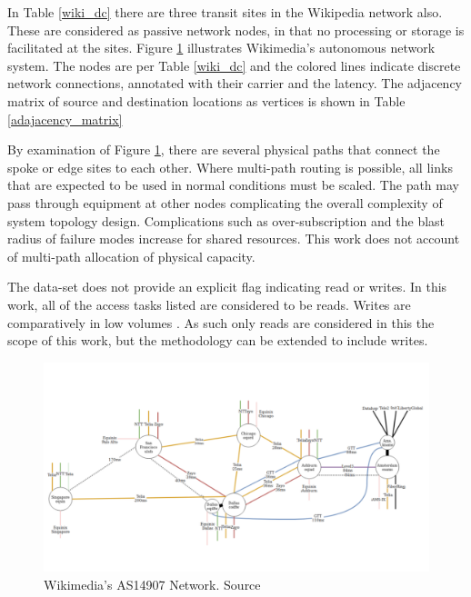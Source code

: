 \documentclass[conference]{IEEEtran}
\begin{document}
In Table \ref{wiki_dc} there are three transit sites in the Wikipedia network also. These are considered as passive network nodes, in that no processing or storage is facilitated at the sites. Figure \ref{wiki_net} illustrates Wikimedia's autonomous network system. The nodes are per Table \ref{wiki_dc} and the colored lines indicate discrete network connections, annotated with their carrier and the latency. The adjacency matrix of source and destination locations as vertices is shown in Table \ref{adajacency_matrix}

By examination of Figure \ref{wiki_net}, there are several physical paths that connect the spoke or edge sites to each other. Where multi-path routing is possible, all links that are expected to be used in normal conditions must be scaled. The path may pass through equipment at other nodes complicating the overall complexity of system topology design. Complications such as over-subscription and the blast radius of failure modes increase for shared resources. This work does not account of multi-path allocation of physical capacity.

The data-set does not provide an explicit flag indicating read or writes. In this work, all of the access tasks listed  are considered to be reads. Writes are comparatively in low volumes \cite{wiki_stats2}. As such only reads are considered in this the scope of this work, but the methodology can be extended to include writes.


\begin{figure}[htbp]
\centering
\includegraphics[scale=.2]{wiki_net.png}
\caption{Wikimedia's AS14907 Network. Source \cite{wiki_network}}
\label{wiki_net}
\end{figure}
\end{document}
